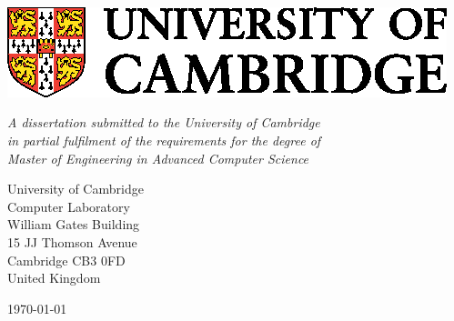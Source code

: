 \begin{titlepage} 

\begin{center}
\noindent
\huge
\dissertationtitle \\
\end{center}

\begin{center}
\noindent
\huge
\authorname \\
\Large
\authorcollege      \\[24pt]
\includegraphics{CUni3.eps}
\end{center}

\vspace{24pt} 

\begin{center}
\noindent
\large
{\it A dissertation submitted to the University of Cambridge \\ 
in partial fulfilment of the requirements for the degree of \\ 
Master of Engineering in Advanced Computer Science} 
\end{center}

\begin{center}
\noindent
University of Cambridge \\
Computer Laboratory     \\
William Gates Building  \\
15 JJ Thomson Avenue    \\
Cambridge CB3 0FD       \\
{\sc United Kingdom}    \\
\end{center}


\begin{center}
\noindent
\today
\end{center}

\end{titlepage} 

\newpage
\vspace*{\fill}
